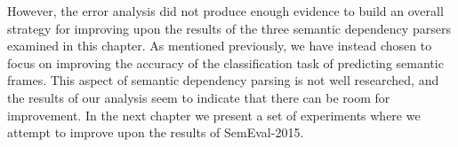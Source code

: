 However, the error analysis did not produce enough evidence to build an overall strategy for improving upon the results of the three semantic dependency parsers examined in this chapter. As mentioned previously, we have instead chosen to focus on improving the accuracy of the classification task of predicting semantic frames. This aspect of semantic dependency parsing is not well researched, and the results of our analysis seem to indicate that there can be room for improvement. In the next chapter we present a set of experiments where we attempt to improve upon the results of SemEval-2015.

